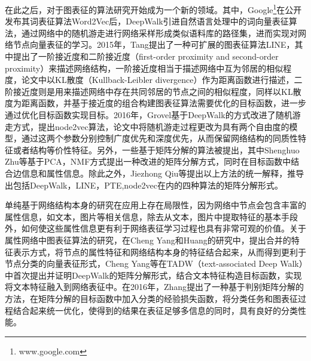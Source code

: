 在此之后，对于图表征的算法研究开始成为一个新的领域。其中，Google\footnote{www.google.com}在公开发布其词表征算法Word2Vec\cite{mikolov2013efficient}后，DeepWalk\cite{perozzi2014deepwalk}引进自然语言处理中的词向量表征算法，通过网络中的随机游走进行网络采样形成类似语料库的路径集，进而实现对网络节点向量表征的学习。2015年，Tang\cite{tang2015line}提出了一种可扩展的图表征算法LINE，其中提出了一阶接近度和二阶接近度（first-order proximity and second-order proximity）来描述网络结构，一阶接近度相当于描述网络中互为邻居的相似程度，论文中以KL散度（Kullback-Leibler divergence）作为距离函数进行描述，二阶接近度则是用来描述网络中存在共同邻居的节点之间的相似程度，同样以KL散度为距离函数，并基于接近度的组合构建图表征算法需要优化的目标函数，进一步通过优化目标函数实现目标。2016年，Grovel\cite{grover2016node2vec}基于DeepWalk的方式改进了随机游走方式，提出node2vec算法，论文中将随机游走过程更改为具有两个自由度的模型，通过这两个参数分别控制广度优先和深度优先，从而保留网络结构的同质性特征或者结构等价性特征。另外，一些基于矩阵分解的算法\cite{ahmed2013distributed,singh2008relational,zhu2007combining}被提出，其中Shenghuo Zhu等基于PCA，NMF方式提出一种改进的矩阵分解方式，同时在目标函数中结合边信息和属性信息。除此之外，Jiezhong Qiu等\cite{qiu2017network}提出以上方法的统一解释，推导出包括DeepWalk，LINE，PTE\cite{tang2015pte},node2vec在内的四种算法的矩阵分解形式。

单纯基于网络结构本身的研究在应用上存在局限性，因为网络中节点会包含丰富的属性信息，如文本，图片等相关信息，除去从文本，图片中提取特征的基本手段外，如何使这些属性信息更有利于网络表征学习过程也具有非常可观的价值。关于属性网络中图表征算法的研究，在Cheng Yang\cite{yang2015network}和Huang\cite{huang2017accelerated}的研究中，提出合并的特征表示方式，将节点的属性特征和网络结构本身的特征结合起来，从而得到更利于节点分类的向量表征形式，Cheng Yang等在TADW（text-associated Deep Walk）中首次提出并证明DeepWalk的矩阵分解形式，结合文本特征构造目标函数，实现将文本特征融入到网络表征中。在2016年，Zhang\cite{zhang2016collective}提出了一种基于判别矩阵分解的方法，在矩阵分解的目标函数中加入分类的经验损失函数，将分类任务和图表征过程结合起来统一优化，使得到的结果在表征足够多信息的同时，具有良好的分类性能。

